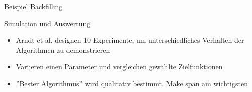 \documentclass[aspectratio=169,10pt]{beamer}
\begin{document}
\begin{frame}[t, fragile]{Beispiel Backfilling}
\end{frame}




\begin{frame}[t, fragile]{Simulation und Auswertung}
	\begin{itemize}
		\item Arndt et al. \alert{designen 10 Experimente}, um unterschiedliches Verhalten der Algorithmen zu demonstrieren
		\item Variieren einen Parameter und vergleichen gew\"ahlte Zielfunktionen
		\item ''Bester Algorithmus'' wird \alert{qualitativ} bestimmt. Make span am wichtigsten
	\end{itemize}
\end{frame}
\end{document}
